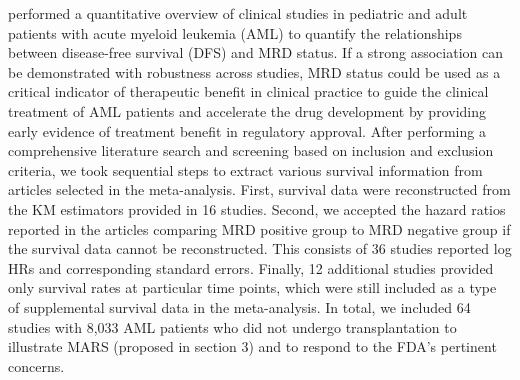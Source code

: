 \documentclass[12pt]{article}
\theoremstyle{mystyle}
\begin{document}
\citet{short2020association} performed a quantitative overview of clinical studies in pediatric and adult patients with acute myeloid leukemia (AML) to quantify the relationships between disease-free survival (DFS) and MRD status.
If a strong association can be demonstrated with robustness across studies, MRD status could be used as a critical indicator of therapeutic benefit in clinical practice to guide the clinical treatment of AML patients and accelerate the drug development by providing early evidence of treatment benefit in regulatory approval.
After performing a comprehensive literature search and screening based on inclusion and exclusion criteria, we took sequential steps to extract various survival information from articles selected in the meta-analysis.  %
First, survival data were reconstructed from the KM estimators provided in 16 studies. Second, we accepted the hazard ratios reported in the articles comparing MRD positive group to MRD negative group if the survival data cannot be reconstructed. This consists of 36 studies reported log HRs and corresponding standard errors.  
Finally, 12 additional studies provided only survival rates at particular time points, which were still included as a type of supplemental survival data in the meta-analysis. In total, we included 64 studies with 8,033 AML patients who did not undergo transplantation to illustrate MARS (proposed in section 3) and to respond to the FDA’s pertinent concerns. 
\end{document}
